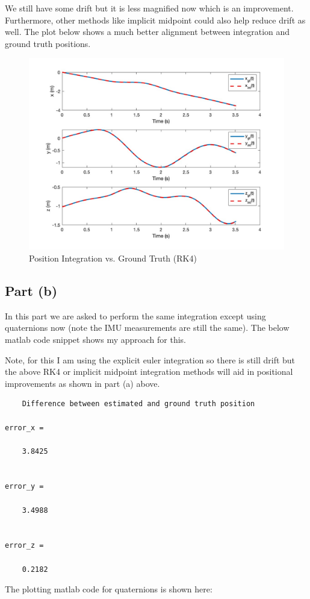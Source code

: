 \documentclass{article}
\begin{document}
We still have some drift but it is less magnified now which is an improvement. Furthermore, other methods like implicit midpoint could also help reduce drift as well. The plot below shows a much better alignment between integration and ground truth positions.
\begin{figure}[H]
    \centering
    \includegraphics[width=0.8\linewidth]{position_rk4.jpg}
    \caption{Position Integration vs. Ground Truth (RK4)}
\end{figure}

\subsection{Part (b)}

In this part we are asked to perform the same integration except using quaternions now (note the IMU measurements are still the same). The below matlab code snippet shows my approach for this.


Note, for this I am using the explicit euler integration so there is still drift but the above RK4 or implicit midpoint integration methods will aid in positional improvements as shown in part (a) above.
\begin{verbatim}
    Difference between estimated and ground truth position

error_x =

    3.8425


error_y =

    3.4988


error_z =

    0.2182
\end{verbatim}

The plotting matlab code for quaternions is shown here:

\end{document}
